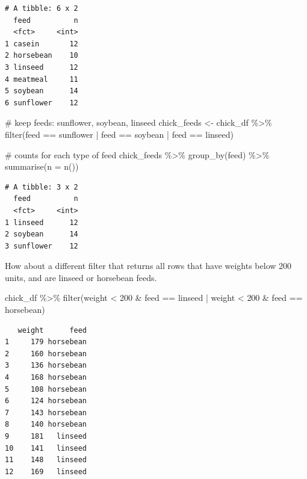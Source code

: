 \documentclass[
  letterpaper,
  DIV=11,
  numbers=noendperiod]{scrreprt}
\newenvironment{Shaded}{\begin{snugshade}}{\end{snugshade}}
\newcommand{\AttributeTok}[1]{\textcolor[rgb]{0.40,0.45,0.13}{#1}}
\newcommand{\CommentTok}[1]{\textcolor[rgb]{0.37,0.37,0.37}{#1}}
\newcommand{\DecValTok}[1]{\textcolor[rgb]{0.68,0.00,0.00}{#1}}
\newcommand{\FunctionTok}[1]{\textcolor[rgb]{0.28,0.35,0.67}{#1}}
\newcommand{\NormalTok}[1]{\textcolor[rgb]{0.00,0.23,0.31}{#1}}
\newcommand{\OtherTok}[1]{\textcolor[rgb]{0.00,0.23,0.31}{#1}}
\newcommand{\SpecialCharTok}[1]{\textcolor[rgb]{0.37,0.37,0.37}{#1}}
\newcommand{\StringTok}[1]{\textcolor[rgb]{0.13,0.47,0.30}{#1}}
\begin{document}
\begin{verbatim}
# A tibble: 6 x 2
  feed          n
  <fct>     <int>
1 casein       12
2 horsebean    10
3 linseed      12
4 meatmeal     11
5 soybean      14
6 sunflower    12
\end{verbatim}

\begin{Shaded}
\begin{Highlighting}[]
\CommentTok{\# keep feeds: sunflower, soybean, linseed}
\NormalTok{chick\_feeds }\OtherTok{\textless{}{-}}\NormalTok{ chick\_df }\SpecialCharTok{\%\textgreater{}\%}
  \FunctionTok{filter}\NormalTok{(feed }\SpecialCharTok{==} \StringTok{\textquotesingle{}sunflower\textquotesingle{}} \SpecialCharTok{|}\NormalTok{ feed }\SpecialCharTok{==} \StringTok{\textquotesingle{}soybean\textquotesingle{}} \SpecialCharTok{|}\NormalTok{ feed }\SpecialCharTok{==} \StringTok{\textquotesingle{}linseed\textquotesingle{}}\NormalTok{)}

\CommentTok{\# counts for each type of feed}
\NormalTok{chick\_feeds }\SpecialCharTok{\%\textgreater{}\%}
  \FunctionTok{group\_by}\NormalTok{(feed) }\SpecialCharTok{\%\textgreater{}\%}
  \FunctionTok{summarise}\NormalTok{(}\AttributeTok{n =} \FunctionTok{n}\NormalTok{())}
\end{Highlighting}
\end{Shaded}

\begin{verbatim}
# A tibble: 3 x 2
  feed          n
  <fct>     <int>
1 linseed      12
2 soybean      14
3 sunflower    12
\end{verbatim}

How about a different filter that returns all rows that have weights
below 200 units, and are linseed or horsebean feeds.

\begin{Shaded}
\begin{Highlighting}[]
\NormalTok{chick\_df }\SpecialCharTok{\%\textgreater{}\%}
  \FunctionTok{filter}\NormalTok{(weight }\SpecialCharTok{\textless{}} \DecValTok{200} \SpecialCharTok{\&}\NormalTok{ feed }\SpecialCharTok{==} \StringTok{\textquotesingle{}linseed\textquotesingle{}} \SpecialCharTok{|}\NormalTok{ weight }\SpecialCharTok{\textless{}} \DecValTok{200} \SpecialCharTok{\&}\NormalTok{ feed }\SpecialCharTok{==} \StringTok{\textquotesingle{}horsebean\textquotesingle{}}\NormalTok{)}
\end{Highlighting}
\end{Shaded}

\begin{verbatim}
   weight      feed
1     179 horsebean
2     160 horsebean
3     136 horsebean
4     168 horsebean
5     108 horsebean
6     124 horsebean
7     143 horsebean
8     140 horsebean
9     181   linseed
10    141   linseed
11    148   linseed
12    169   linseed
\end{verbatim}
\end{document}
